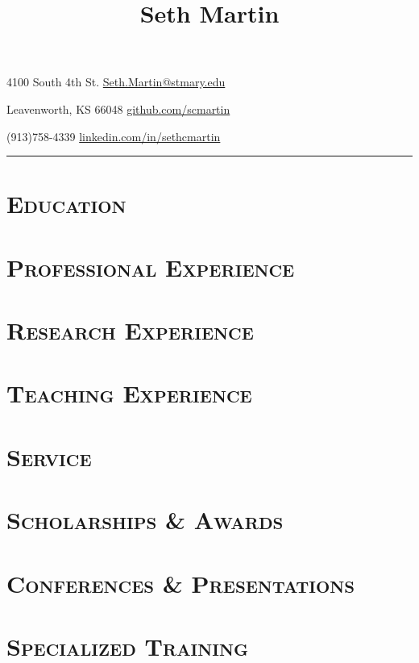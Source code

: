 \documentclass[10pt]{article}
\title{\Huge \bf Seth Martin}
\date{}
\author{}
\begin{document}
\maketitle

\setlength{\parindent}{0ex}
4100 South 4th St. \hfill \href{mailto:Seth.Martin@stmary.edu}{Seth.Martin@stmary.edu}

Leavenworth, KS 66048 \hfill \href{https://github.com/scmartin}{github.com/scmartin}

(913)758-4339 \hfill \href{https://www.linkedin.com/in/sethcmartin}{linkedin.com/in/sethcmartin}
\hrule

\allsectionsfont{\sectionrule{0ex}{0pt}{-1ex}{1pt}}

\section*{\textsc{Education}}


\section*{\textsc{Professional Experience}}


\section*{\textsc{Research Experience}}


\section*{\textsc{Teaching Experience}}


\section*{\textsc{Service}}


\section*{\textsc{Scholarships \& Awards}}


\section*{\textsc{Conferences \& Presentations}}



\section*{\textsc{Specialized Training}}



\nocite{*}


\end{document}
